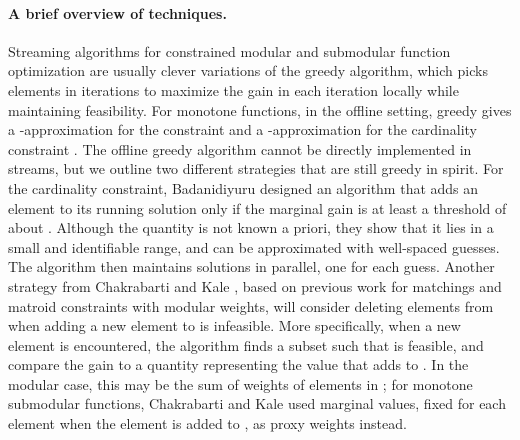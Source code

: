 \documentclass[oneside,letterpaper]{scrartcl} \usepackage{macros}
\begin{document}
\paragraph{A brief overview of techniques.} Streaming algorithms for constrained modular and submodular function
optimization are usually clever variations of the greedy algorithm,
which picks elements in iterations to maximize the gain in each
iteration locally while maintaining feasibility.  For monotone
functions, in the offline setting, greedy gives a
-approximation for the  constraint and
a -approximation for the cardinality constraint
\cite{fnw-mssf2-78}. The offline greedy algorithm cannot be directly
implemented in streams, but we outline two different strategies that
are still greedy in spirit. For the cardinality constraint, Badanidiyuru \etal \cite{bmkk-sso-14}
designed an algorithm that adds an element to its running solution 
only if the marginal gain is at least a threshold of about
. Although the quantity  is not known a priori, they
show that it lies in a small and identifiable range, and can be
approximated with  well-spaced guesses. The algorithm then
maintains  solutions in parallel, one for each
guess. Another strategy from Chakrabarti and Kale \cite{ck-smms-14},
based on previous work for matchings \cite{fkmsz-gpssm-05,m-fgmds-05}
and matroid constraints \cite{abv-11} with modular weights, will
consider deleting elements from  when adding a new element to 
is infeasible. More specifically, when a new element  is
encountered, the algorithm finds a subset  such that
 is feasible, and compare the gain  to a quantity representing the value that
 adds to . In the modular case, this may be the sum of weights
of elements in ; for monotone submodular functions, Chakrabarti and
Kale used marginal values, fixed for each element when the element is
added to , as proxy weights instead.
\end{document}
